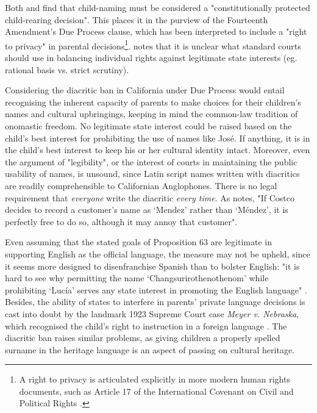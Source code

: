 Both \textcite{larson11} and \textcite[598]{foggan83} find that child-naming must
be considered a "constitutionally protected child-rearing decision". This
places it in the purview of the Fourteenth Amendment's Due Process clause,
which has been interpreted to include a "right to privacy" in parental
decisions\footnote{A right to privacy is articulated explicitly in more modern
human rights documents, such as Article 17 of the International Covenant on
Civil and Political Rights \parencite{iccpr}.}. \textcite{larson11} notes that
it is unclear what standard courts should use in balancing individual rights
against legitimate state interests (eg. rational basis vs. strict scrutiny).

Considering the diacritic ban in California under Due Process would entail
recognising the inherent capacity of parents to make choices for their
children's names and cultural upbringings, keeping in mind the common-law
tradition of onomastic freedom. No legitimate state interest could be raised
based on the child's best interest for prohibiting the use of names like José.
If anything, it is in the child's best interest to keep his or her cultural
identity intact. Moreover, even the argument of "legibility", or the interest
of courts in maintaining the public usability of names, is unsound, since Latin
script names written with diacritics are readily comprehensible to Californian
Anglophones. There is no legal requirement that \textit{everyone} write the
diacritic \textit{every time}. As \textcite[191]{larson11} notes, "If Costco
decides to record a customer's name as `Mendez' rather than `Méndez', it is
perfectly free to do so, although it may annoy that customer".

Even assuming that the stated goals of Proposition 63 are legitimate in
supporting English as the official language, the measure may not be upheld,
since it seems more designed to disenfranchise Spanish than to bolster English:
"it is hard to see why permitting the name `Changsurirothenothenom' while
prohibiting `Lucía' serves any state interest in promoting the English
language" \parencite[189]{larson11}. Besides, the ability of states to
interfere in parents' private language decisions is cast into doubt by the
landmark 1923 Supreme Court case \textit{Meyer v. Nebraska}, which recognised
the child's right to instruction in a foreign language \parencite{larson11}
\parencite{baron92}. The diacritic ban raises similar problems, as giving
children a properly spelled surname in the heritage language is an aspect of
passing on cultural heritage.

